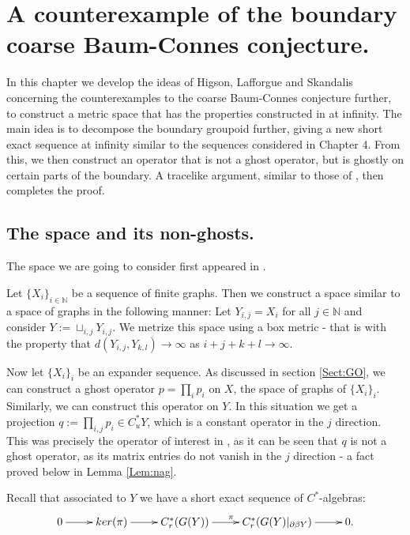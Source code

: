 \chapter{A counterexample of the boundary coarse Baum-Connes conjecture.}
In this chapter we develop the ideas of Higson, Lafforgue and Skandalis concerning the counterexamples to the coarse Baum-Connes conjecture further, to construct a metric space that has the properties constructed in \cite{} at infinity. The main idea is to decompose the boundary groupoid further, giving a new short exact sequence at infinity similar to the sequences considered in Chapter 4. From this, we then construct an operator that is not a ghost operator, but is ghostly on certain parts of the boundary. A tracelike argument, similar to those of \cite{higsonpreprint, explg1, }, then completes the proof.

\section{The space and its non-ghosts.}

The space we are going to consider first appeared in \cite{MR2363697}.

Let $\lbrace X_{i} \rbrace_{i \in \mathbb{N}}$ be a sequence of finite graphs. Then we construct a space similar to a space of graphs in the following manner: Let $Y_{i,j} = X_{i}$ for all $j \in \mathbb{N}$ and consider $Y:= \sqcup_{i,j} Y_{i,j}$. We metrize this space using a box metric - that is with the property that $d(Y_{i,j},Y_{k,l}) \rightarrow \infty$ as $i+j+k+l \rightarrow \infty$. 

Now let $\lbrace X_{i} \rbrace_{i}$ be an expander sequence. As discussed in section \ref{Sect:GO}, we can construct a ghost operator $p= \prod_{i} p_{i}$ on $X$, the space of graphs of $\lbrace X_{i} \rbrace_{i}$. Similarly, we can construct this operator on $Y$. In this situation we get a projection $q:=\prod_{i,j}p_{i} \in C^{*}_{u}Y$, which is a constant operator in the $j$ direction. This was precisely the operator of interest in \cite{MR2363697}, as it can be seen that $q$ is not a ghost operator, as its matrix entries do not vanish in the $j$ direction - a fact proved below in Lemma \ref{Lem:nag}.

Recall that associated to $Y$ we have a short exact sequence of $C^{*}$-algebras:
\begin{equation*}
\xymatrix{
0 \ar[r] & ker(\pi) \ar[r]& C_{r}^{*}(G(Y)) \ar[r]^{\pi} & C_{r}^{*}(G(Y)|_{\partial\beta Y}) \ar[r] & 0.
}
\end{equation*}

